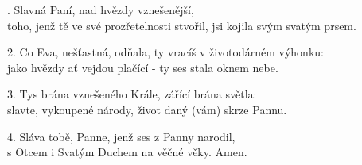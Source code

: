 . Slavná Paní, nad hvězdy vznešenější,\\
toho, jenž tě ve své prozřetelnosti stvořil, jsi kojila svým svatým prsem.

2. Co Eva, nešťastná, odňala, ty vracíš v životodárném výhonku:\\
jako hvězdy ať vejdou plačící - ty ses stala oknem nebe.

3. Tys brána vznešeného Krále, zářící brána světla:\\
slavte, vykoupené národy, život daný (vám) skrze Pannu.

4. Sláva tobě, Panne, jenž ses z Panny narodil,\\
s Otcem i Svatým Duchem na věčné věky. Amen.
